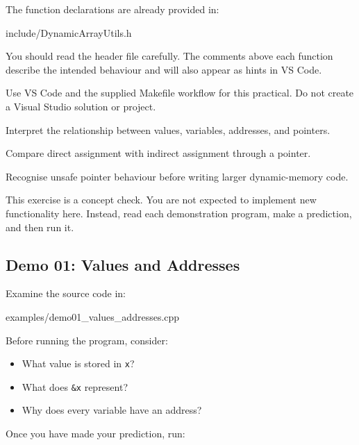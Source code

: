 \documentclass{csc2059practical}
\begin{document}
The function declarations are already provided in:

\begin{terminal}
include/DynamicArrayUtils.h
\end{terminal}

You should read the header file carefully. The comments above each function describe the intended behaviour and will also appear as hints in VS Code.

\begin{importantnote}
Use VS Code and the supplied Makefile workflow for this practical. Do not create a Visual Studio solution or project.
\end{importantnote}


\begin{exerciseobjectives}
  \item Interpret the relationship between values, variables, addresses, and pointers.
  \item Compare direct assignment with indirect assignment through a pointer.
  \item Recognise unsafe pointer behaviour before writing larger dynamic-memory code.
\end{exerciseobjectives}

This exercise is a concept check. You are not expected to implement new functionality here. Instead, read each demonstration program, make a prediction, and then run it.

\subsection*{Demo 01: Values and Addresses}

Examine the source code in:

\begin{terminal}
examples/demo01_values_addresses.cpp
\end{terminal}

Before running the program, consider:
\begin{itemize}
  \item What value is stored in \texttt{x}?
  \item What does \texttt{\&x} represent?
  \item Why does every variable have an address?
\end{itemize}

Once you have made your prediction, run:
\end{document}
